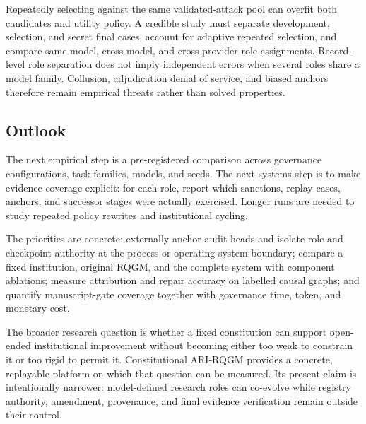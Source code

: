 Repeatedly selecting against the same validated-attack pool can overfit both
candidates and utility policy. A credible study must separate development,
selection, and secret final cases, account for adaptive repeated selection,
and compare same-model, cross-model, and cross-provider role assignments.
Record-level role separation does not imply independent errors when several
roles share a model family. Collusion, adjudication denial of service, and
biased anchors therefore remain empirical threats rather than solved
properties.

\subsection{Outlook}\label{sec:discussion:outlook}

The next empirical step is a pre-registered comparison across governance
configurations, task families, models, and seeds. The next systems step is
to make evidence coverage explicit: for each role, report which sanctions,
replay cases, anchors, and successor stages were actually exercised.
Longer runs are needed to study repeated policy rewrites and institutional
cycling.

The priorities are concrete: externally anchor audit heads and isolate role
and checkpoint authority at the process or operating-system boundary;
compare a fixed institution, original RQGM, and
the complete system with component ablations; measure attribution and
repair accuracy on labelled causal graphs; and quantify manuscript-gate
coverage together with governance time, token, and monetary cost.

The broader research question is whether a fixed constitution can support
open-ended institutional improvement without becoming either too weak to
constrain it or too rigid to permit it. Constitutional ARI-RQGM provides a
concrete, replayable platform on which that question can be measured. Its
present claim is intentionally narrower: model-defined research roles can
co-evolve while registry authority, amendment, provenance, and final
evidence verification remain outside their control.
